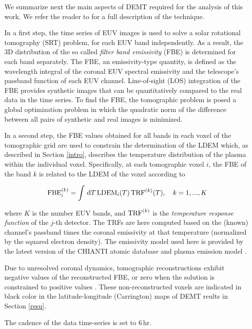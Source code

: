 \documentclass[namedreferences]{solarphysics}
\newcommand{\LDEM}{{\rm LDEM}}
\newcommand{\FBE}{{\rm FBE}}
\newcommand{\TRF}{{\rm TRF}}
\begin{document}
\begin{article}
{We summarize next the main aspects of DEMT required for the analysis of this work. We refer the reader to \citet{frazin_2009} for a full description of the technique.}

In a first step, the time series of EUV images is used to solve a solar rotational tomography (SRT) problem, for each EUV band independently. As a result, the 3D distribution of the so called \emph{filter band emissivity} (FBE) is determined for each band separately. The FBE, {an emissivity-type quantity}, is defined as the wavelength integral of the coronal EUV spectral emissivity and the telescope's passband function of each EUV channel. Line-of-sight (LOS) integration of the FBE provides synthetic images that can be quantitatively compared to the real data in the time series. To find the FBE, the tomographic problem is posed a global optimization problem in which the quadratic norm of the difference between all {pairs of synthetic and real images is minimized.}

{In a second step, the FBE values obtained for all bands in each voxel {of the tomographic grid are used to constrain the determination of the LDEM which, as described in Section \ref{intro}, describes the temperature distribution of the plasma within the individual voxel.} Specifically, at each tomographic voxel $i$, the FBE of the band $k$ is related to the LDEM of the voxel according to}

\begin{equation}\label{fbeldem}
\FBE_i^{(k)}  = \int\,\textrm{d}T\,\LDEM_i(T)\,{\TRF}^{(k)}(T), \ \ \ {k=1,...,K}
\end{equation}

\noindent
{where $K$ is the number EUV bands, and $\TRF^{(k)}$ is the \emph{temperature response function} of the $j$-th detector. The TRFs are here computed based on the (known) channel’s passband times the coronal emissivity at that temperature (normalized by the squared electron density). The emissivity model used here is provided by the latest version of the CHIANTI atomic database and plasma emission model \citep{delzanna_2015,landi_2013}.}

Due to unresolved coronal dynamics, tomographic reconstructions exhibit negative values of the reconstructed FBE, or zero when the solution is constrained to positive values \citep{frazin_2000,frazin_2009}. These non-reconstructed voxels are indicated {in black color in the latitude-longitude (Carrington) maps of DEMT} reults in Section \ref{resu}.

The cadence of the data time-series is set to 6\,hr.


\end{article}
\end{document}
